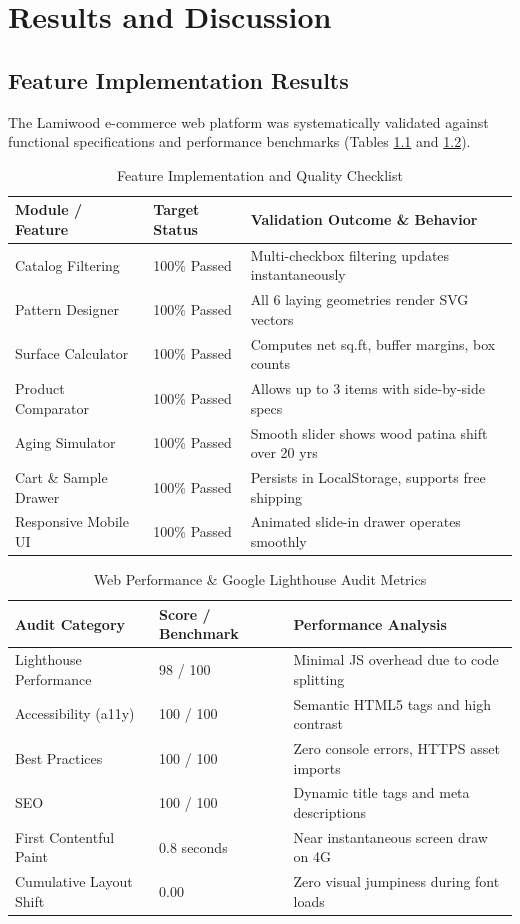 \documentclass[12pt,a4paper]{report}
\begin{document}
\chapter{Results and Discussion}

\section{Feature Implementation Results}
The Lamiwood e-commerce web platform was systematically validated against functional specifications and performance benchmarks (Tables \ref{tab:results} and \ref{tab:lighthouse}).

\begin{table}[htbp]
\centering
\caption{Feature Implementation and Quality Checklist}
\label{tab:results}
\begin{tabular}{lll}
\toprule
\textbf{Module / Feature} & \textbf{Target Status} & \textbf{Validation Outcome \& Behavior} \\
\midrule
Catalog Filtering & 100\% Passed & Multi-checkbox filtering updates instantaneously \\
Pattern Designer & 100\% Passed & All 6 laying geometries render SVG vectors \\
Surface Calculator & 100\% Passed & Computes net sq.ft, buffer margins, box counts \\
Product Comparator & 100\% Passed & Allows up to 3 items with side-by-side specs \\
Aging Simulator & 100\% Passed & Smooth slider shows wood patina shift over 20 yrs \\
Cart \& Sample Drawer & 100\% Passed & Persists in LocalStorage, supports free shipping \\
Responsive Mobile UI & 100\% Passed & Animated slide-in drawer operates smoothly \\
\bottomrule
\end{tabular}
\end{table}

\begin{table}[htbp]
\centering
\caption{Web Performance \& Google Lighthouse Audit Metrics}
\label{tab:lighthouse}
\begin{tabular}{lll}
\toprule
\textbf{Audit Category} & \textbf{Score / Benchmark} & \textbf{Performance Analysis} \\
\midrule
Lighthouse Performance & 98 / 100 & Minimal JS overhead due to code splitting \\
Accessibility (a11y) & 100 / 100 & Semantic HTML5 tags and high contrast \\
Best Practices & 100 / 100 & Zero console errors, HTTPS asset imports \\
SEO & 100 / 100 & Dynamic title tags and meta descriptions \\
First Contentful Paint & 0.8 seconds & Near instantaneous screen draw on 4G \\
Cumulative Layout Shift & 0.00 & Zero visual jumpiness during font loads \\
\bottomrule
\end{tabular}
\end{table}
\end{document}
